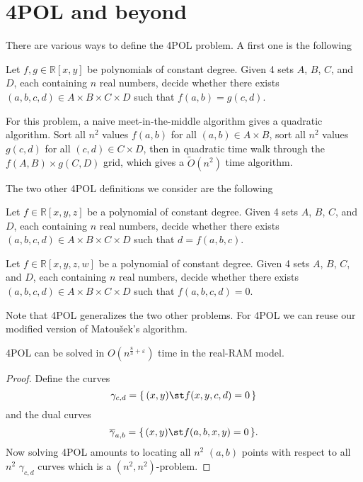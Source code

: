 \section{4POL and beyond}

There are various ways to define the 4POL problem. A first one is the following
\begin{problem}
Let $f,g \in \mathbb{R}[x,y]$ be polynomials of constant degree.
Given 4 sets $A$, $B$, $C$, and $D$, each containing $n$ real numbers, decide
whether there exists $(a,b,c,d) \in A \times B \times C \times D$ such that
$f(a,b)=g(c,d)$.
\end{problem}
For this problem, a naive meet-in-the-middle algorithm gives a quadratic
algorithm. Sort all $n^2$ values $f(a,b)$ for all $(a,b) \in A \times B$,
sort all $n^2$ values $g(c,d)$ for all $(c,d) \in C \times D$, then in
quadratic time walk through the $f(A,B) \times g(C,D)$ grid,
which gives a $\tilde{O}(n^2)$ time algorithm.

The two other 4POL definitions we consider are the following
\begin{problem}
Let $f \in \mathbb{R}[x,y,z]$ be a polynomial of constant degree.
Given 4 sets $A$, $B$, $C$, and $D$, each containing $n$ real numbers, decide
whether there exists $(a,b,c,d) \in A \times B \times C \times D$ such that
$d=f(a,b,c)$.
\end{problem}
\begin{problem}[4POL]
Let $f \in \mathbb{R}[x,y,z,w]$ be a polynomial of constant degree.
Given 4 sets $A$, $B$, $C$, and $D$, each containing $n$ real numbers, decide
whether there exists $(a,b,c,d) \in A \times B \times C \times D$ such that
$f(a,b,c,d)=0$.
\end{problem}
Note that 4POL generalizes the two other problems. For 4POL we
can reuse our modified version of Matou\v{s}ek's algorithm.
\begin{theorem}
	4POL can be solved in $O(n^{\frac 83 + \varepsilon})$ time in the real-RAM
	model.
\end{theorem}
\begin{proof}
Define the curves
\begin{displaymath}
	\gamma_{c,d} = \{\,(x,y)\st f(x,y,c,d)=0\,\}
\end{displaymath}
and the dual curves
\begin{displaymath}
	\overline{\gamma}_{a,b} = \{\,(x,y)\st f(a,b,x,y)=0\,\}.
\end{displaymath}
Now solving 4POL amounts to locating all $n^2$ $(a,b)$ points with
respect to all $n^2$ $\gamma_{c,d}$ curves which is a $(n^2,n^2)$-problem.
\end{proof}

